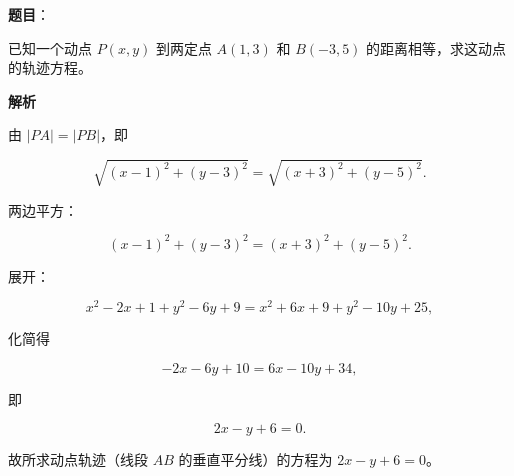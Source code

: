 \begin{answer}

\textbf{题目}：

已知一个动点 $P(x,y)$ 到两定点 $A(1,3)$ 和 $B(-3,5)$ 的距离相等，求这动点的轨迹方程。

\textbf{解析}

由 $|PA|=|PB|$，即

\nopagebreak[4]
\[
\sqrt{(x-1)^2+(y-3)^2}=\sqrt{(x+3)^2+(y-5)^2}.
\]

两边平方：

\nopagebreak[4]
\[
(x-1)^2+(y-3)^2=(x+3)^2+(y-5)^2.
\]

展开：

\nopagebreak[4]
\[
x^2-2x+1+y^2-6y+9=x^2+6x+9+y^2-10y+25,
\]

化简得

\nopagebreak[4]
\[
-2x-6y+10=6x-10y+34,
\]

即

\nopagebreak[4]
\[
2x-y+6=0.
\]

故所求动点轨迹（线段 $AB$ 的垂直平分线）的方程为 $2x-y+6=0$。


\end{answer}